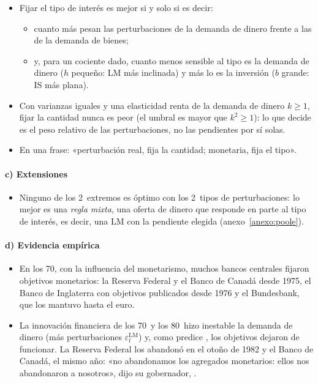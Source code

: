 \documentclass[11pt]{article}
\begin{document}
\begin{itemize}
\item Fijar el tipo de interés es mejor si y solo si
  es decir:
  \begin{itemize}
  \item cuanto más pesan las perturbaciones de la demanda de dinero frente a las de la demanda de bienes;
  \item y, para un cociente dado, cuanto menos sensible al tipo es la demanda de dinero ($h$ pequeño: LM más inclinada) y más lo es la inversión ($b$ grande: IS más plana).
  \end{itemize}
\item Con varianzas iguales y una elasticidad renta de la demanda de dinero $k\geq1$, fijar la cantidad nunca es peor (el umbral es mayor que $k^2\geq1$): lo que decide es el peso relativo de las perturbaciones, no las pendientes por sí solas.
\item En una frase: «perturbación real, fija la cantidad; monetaria, fija el tipo».
\end{itemize}

\paragraph{c) Extensiones}

\begin{itemize}
\item Ninguno de los 2~extremos es óptimo con los 2~tipos de perturbaciones: lo mejor es una \emph{regla mixta}, una oferta de dinero que responde en parte al tipo de interés, es decir, una LM con la pendiente elegida\nocite{Poole1970Optimal} (anexo~\ref{anexo:poole}).
\end{itemize}

\paragraph{d) Evidencia empírica}

\begin{itemize}
\item En los 70, con la influencia del monetarismo, muchos bancos centrales fijaron objetivos monetarios: la Reserva Federal y el Banco de Canadá desde 1975, el Banco de Inglaterra con objetivos publicados desde 1976 y el Bundesbank, que los mantuvo hasta el euro\nocite{MishkinMatthewsGiuliodori2013,Hotson2010British}.
\item La innovación financiera de los 70~y los 80~hizo inestable la demanda de dinero (más perturbaciones $\varepsilon^{\mathrm{LM}}_t$) y, como predice , los objetivos dejaron de funcionar. La Reserva Federal los abandonó en el otoño de 1982 y el Banco de Canadá, el mismo año: «no abandonamos los agregados monetarios: ellos nos abandonaron a nosotros», dijo su gobernador, \nocite{Bouey1982Statement,Mishkin1999International}.
\end{itemize}
\end{document}
